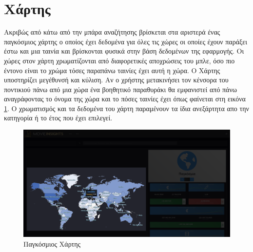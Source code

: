\section{Χάρτης}
Ακριβώς από κάτω από την μπάρα αναζήτησης βρίσκεται στα αριστερά ένας παγκόσμιος χάρτης ο οποίος έχει δεδομένα για όλες τις χώρες οι οποίες έχουν παράξει έστω και μια ταινία και βρίσκονται φυσικά στην βάση δεδομένων της εφαρμογής.
Οι χώρες στον χάρτη χρωματίζονται από διαφορετικές αποχρώσεις του μπλε, όσο πιο έντονο είναι το χρώμα τόσες παραπάνω ταινίες έχει αυτή η χώρα. Ο Χάρτης υποστηρίζει μεγέθυνσή και κύλιση. Αν ο χρήστης μετακινήσει τον κένσορα του ποντικιού πάνω από μια χώρα ένα βοηθητικό παραθυράκι θα εμφανιστεί από πάνω αναγράφοντας το όνομα της χώρα και το πόσες ταινίες έχει όπως φαίνεται στη εικόνα \ref{demo:map}. Ο χρωματισμός και τα δεδομένα του χάρτη παραμένουν τα ίδια ανεξάρτητα απο την κατηγορία ή το έτος που έχει επιλεγεί.

\begin{figure}[H]
  \centering
  \includegraphics[width=145mm]{Chapters/6 - Manual/Images/main_page_map.png}
  \caption{Παγκόσμιος Χάρτης}
  \label{demo:map}
\end{figure}